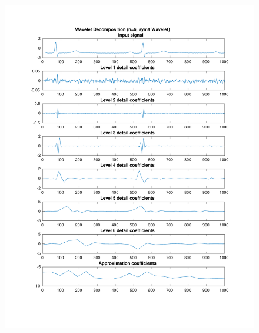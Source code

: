 \documentclass{beamer}
\begin{document}
\begin{frame}
\begin{columns}
\begin{figure}
\includegraphics[width=\textwidth]{fig/123l1_dwt2.pdf}
\end{figure}
\end{columns}
\end{frame}
\end{document}

